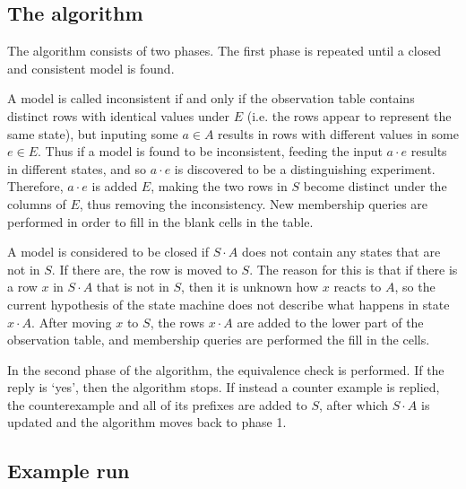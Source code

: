 \documentclass[multi,crop=false,class=article]{standalone}
\newcommand{\concat}{\cdot}
\begin{document}
\subsection {The algorithm}

The algorithm consists of two phases. The first phase is repeated until a closed
and consistent model is found.

A model is called inconsistent if and only if the observation table contains
distinct rows with identical values under $E$ (i.e. the rows appear to represent
the same state), but inputing some $a \in A$ results in rows with different
values in some $e \in E$. Thus if a model is found to be inconsistent, feeding
the input $a \concat e$ results in different states, and so $a \concat e$ is
discovered to be a distinguishing experiment. Therefore, $a \concat e$ is added
$E$, making the two rows in $S$ become distinct under the columns of $E$, thus
removing the inconsistency. New membership queries are performed in order to
fill in the blank cells in the table.

A model is considered to be closed if $S \concat A$ does not contain any states
that are not in $S$. If there are, the row is moved to $S$. The reason for this
is that if there is a row $x$ in $S \concat A$ that is not in $S$, then it is
unknown how $x$ reacts to $A$, so the current hypothesis of the state machine
does not describe what happens in state $x \concat A$. After moving $x$ to $S$,
the rows $x \concat A$ are added to the lower part of the observation table, and
membership queries are performed the fill in the cells. 

In the second phase of the algorithm, the equivalence check is performed. If the
reply is `yes', then the algorithm stops. If instead a counter example is
replied, the counterexample and all of its prefixes are added to $S$, after
which $S \concat A$ is updated and the algorithm moves back to phase 1.

\subsection {Example run}
\end{document}
